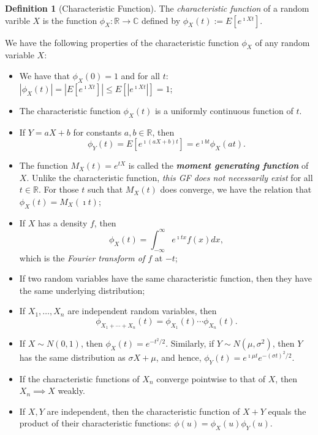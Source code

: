 \documentclass[12pt,reqno]{article}
\renewcommand{\emph}[1]{\textit{#1}}
\theoremstyle{plain}
\theoremstyle{definition}
\newtheorem{definition}[theorem]{Definition}
\begin{document}
\begin{definition}[Characteristic Function]
The \emph{characteristic function} of a random varible $X$ is the 
function $\phi_X: \mathbb{R} \rightarrow \mathbb{C}$ defined by 
$\phi_X(t) := E[e^{\imath Xt}]$. 
\end{definition} 

We have the following properties of the characteristic function $\phi_X$ of 
any random variable $X$: 
\begin{itemize} 

\item We have that $\phi_X(0) = 1$ and for all $t$: 
     $|\phi_X(t)| = |E[e^{\imath Xt}]| \leq E[|e^{\imath Xt}|] = 1$; 
\item The characteristic function $\phi_X(t)$ is a uniformly continuous 
    function of $t$. 
\item If $Y = aX+b$ for constants $a,b \in \mathbb{R}$, then 
     $$\phi_Y(t) = E[e^{\imath(aX+b)t}] = e^{\imath bt} \phi_X(at).$$ 
\item The function $M_X(t) = e^{tX}$ is called the 
     \textbf{\emph{moment generating function}} of $X$. Unlike the characteristic 
     function, \emph{this GF does not necessarily exist} for all $t \in \mathbb{R}$. 
     For those $t$ such that $M_X(t)$ does converge, we have the 
     relation that $\phi_X(t) = M_X(\imath t)$; 
\item If $X$ has a density $f$, then 
      \[
      \phi_X(t) = \int_{-\infty}^{\infty} e^{\imath tx} f(x) dx, 
      \]
      which is the \emph{Fourier transform of $f$} at $-t$; 
\item If two random variables have the same characteristic function, then 
     they have the same underlying distribution; 
\item If $X_1,\ldots,X_n$ are independent random variables, then 
     \[
     \phi_{X_1+\cdots+X_n}(t) = \phi_{X_1}(t) \cdots \phi_{X_n}(t). 
     \]
\item If $X \sim N(0, 1)$, then $\phi_X(t) = e^{-t^2 / 2}$. Similarly, if 
     $Y \sim N(\mu, \sigma^2)$, then $Y$ has the same distribution as 
     $\sigma X+\mu$, and hence, 
     $\phi_Y(t) = e^{\imath\mu t} e^{-(\sigma t)^2 / 2}$. 
\item If the characteristic functions of $X_n$ converge pointwise to that 
     of $X$, then $X_n \implies X$ weakly. 
\item If $X,Y$ are independent, then the characteristic function of 
     $X+Y$ equals the product of their characteristic functions: 
     $\phi(u) = \phi_X(u) \phi_Y(u)$. 

\end{itemize} 
\end{document}
